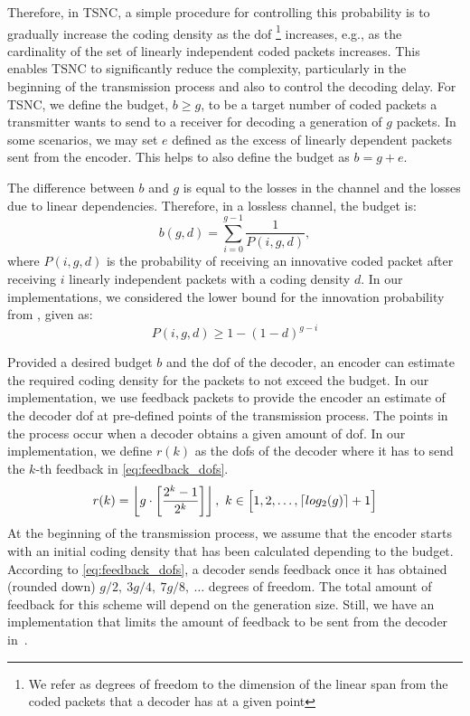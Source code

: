 Therefore, in \ac{TSNC}, a simple procedure for controlling this probability
is to gradually increase the coding density as the \ac{dof} \footnote{We refer
as degrees of freedom to the dimension of the linear span from the coded
packets that a decoder has at a given point} increases, e.g., as the
cardinality of the set of linearly independent coded packets increases. This enables
\ac{TSNC} to significantly reduce the complexity, particularly in the
beginning of the transmission process and also to control the decoding
delay. For \ac{TSNC}, we define the budget, $b \geq g$, to be a target
number of coded packets a transmitter wants to send to a receiver
for decoding a generation of $g$ packets. In some scenarios, we may set
$e$ defined as the excess of linearly dependent packets sent from the encoder.
This helps to also define the budget as $b = g + e$.

The difference between $b$ and $g$ is equal to the losses in the channel
and the losses due to linear dependencies. Therefore, in a lossless
channel, the budget is:
\begin{equation}\label{eq:budget}
    b(g,d)=\sum^{g-1}_{i=0}\frac{1}{P(i,g,d)},
\end{equation}
where $P(i,g,d)$ is the probability of receiving an innovative coded packet
after receiving $i$ linearly independent packets with a coding density $d$. In our
implementations, we considered the lower bound for the innovation probability
from \cite{feizi2014tunable}, given as:
\begin{equation}
    P(i,g,d) \geq 1-(1-d)^{g-i}
\end{equation}

Provided a desired budget $b$ and the \ac{dof} of the decoder, an encoder
can estimate the required coding density for the packets to not exceed the
budget. In our implementation, we use feedback packets to provide the
encoder an estimate of the decoder \ac{dof} at pre-defined points of the
transmission process. The points in the process occur when a decoder
obtains a given amount of \ac{dof}. In our implementation, we define $r(k)$ as the \ac{dof}s of the decoder where it has to send the $k$-th feedback in
\eqref{eq:feedback_dofs}.
%
\begin{equation}\label{eq:feedback_dofs}
    r(k) = \left\lfloor g\cdot \left[\frac{2^k -1}{2^k}\right]\right\rfloor,\ k \in \Big[1, 2, \ldots,\left\lceil log_2(g)\right\rceil+1\Big]
\end{equation}
%
At the beginning of the transmission process, we assume that the encoder
starts with an initial coding density that has been calculated depending to
the budget. According to \eqref{eq:feedback_dofs}, a decoder sends feedback
once it has obtained (rounded down) $g/2,\ 3g/4,\ 7g/8,\ \ldots$  degrees of
freedom. The total amount of feedback for this scheme will depend on the
generation size. Still, we have an implementation that limits the amount of
feedback to be sent from the decoder in~\cite{practicalview_tsnc2015}.

